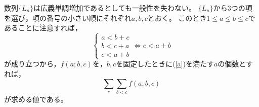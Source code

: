 \documentclass{article}
\begin{document}
数列$\{L_n\}$は広義単調増加であるとしても一般性を失わない。
$\{L_n\}$から3つの項を選び，項の番号の小さい順にそれぞれ$a, b, c$とおく。
このとき$1 \leq a \leq b \leq c$であることに注意すれば，
\begin{equation}
    \label{a}
    \begin{cases}
        a < b + c \\
        b < c + a \\
        c < a + b
    \end{cases}
    \Longleftrightarrow
    c < a + b
\end{equation}
が成り立つから，$f(a; b, c)$を，$b, c$を固定したときに(\ref{a})を満たす$a$の個数とすれば，
\begin{equation*}
    \sum_{c} \sum_{b < c} f(a; b, c)
\end{equation*}
が求める値である。
\end{document}
